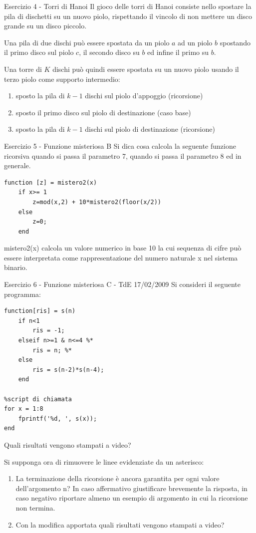 \documentclass[handout]{beamer}
\begin{document}
\begin{frame}{Esercizio 4 - Torri di Hanoi}
	Il gioco delle torri di Hanoi consiste nello spostare la pila di dischetti su un nuovo piolo, rispettando il vincolo di non mettere un disco grande su un disco piccolo.
	
	\pause
	Una pila di due dischi può essere spostata da un piolo $a$ ad un piolo $b$ spostando il primo disco sul piolo $c$, il secondo disco su $b$ ed infine il primo su $b$.
	
	\pause
	Una torre di $K$ dischi può quindi essere spostata su un nuovo piolo usando il terzo piolo come supporto intermedio:
	\begin{enumerate}
		\item sposto la pila di $k-1$ dischi sul piolo d'appoggio (ricorsione)
		\item sposto il primo disco sul piolo di destinazione (caso base)
		\item sposto la pila di $k-1$ dischi sul piolo di destinazione (ricorsione)
	\end{enumerate}
\end{frame}

\begin{frame}[fragile]{Esercizio 5 - Funzione misteriosa B}
	Si dica cosa calcola la seguente funzione ricorsiva quando si passa il parametro 7, quando si passa il parametro 8 ed in generale.
	
\begin{lstlisting}
function [z] = mistero2(x)
	if x>= 1
		z=mod(x,2) + 10*mistero2(floor(x/2))
	else
		z=0;
	end
\end{lstlisting}

\pause
mistero2(x) calcola un valore numerico in base 10 la cui sequenza di cifre può essere
interpretata come rappresentazione del numero naturale x nel sistema binario.
\end{frame}

\begin{frame}{Esercizio 6 - Funzione misteriosa C - TdE 17/02/2009}
	Si consideri il seguente programma:
\begin{lstlisting}[basicstyle=\small]
function[ris] = s(n)
	if n<1
		ris = -1;
	elseif n>=1 & n<=4 %*
		ris = n; %*
	else
		ris = s(n-2)*s(n-4);
	end

%script di chiamata
for x = 1:8
	fprintf('%d, ', s(x));	
end	
\end{lstlisting}
	
	Quali risultati vengono stampati a video?
	
	Si supponga ora di rimuovere le linee evidenziate da un asterisco:
	\begin{enumerate}
		\item La terminazione della ricorsione è ancora garantita per ogni valore
		dell’argomento n? In caso affermativo giustificare brevemente la risposta,
		in caso negativo riportare almeno un esempio di argomento in cui la
		ricorsione non termina.
		
		\item Con la modifica apportata quali risultati vengono stampati a video?
	\end{enumerate}
\end{frame}
\end{document}
